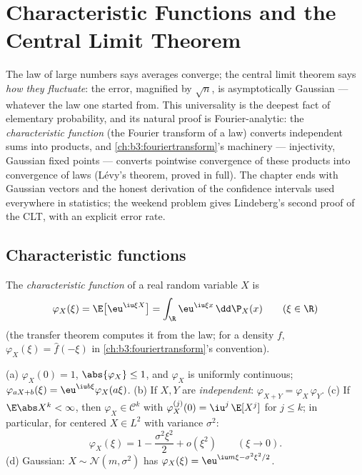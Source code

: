 \chapter{Characteristic Functions and the Central Limit
Theorem}\label{ch:b3:clt}

The law of large numbers says averages converge; the central
limit theorem says \emph{how they fluctuate}: the error,
magnified by $\sqrt n$, is asymptotically Gaussian ---
whatever the law one started from. This universality is the
deepest fact of elementary probability, and its natural proof
is Fourier-analytic: the \emph{characteristic function}
(the Fourier transform of a law) converts independent sums
into products, and \cref{ch:b3:fouriertransform}'s machinery
--- injectivity, Gaussian fixed points --- converts pointwise
convergence of these products into convergence of laws
(L\'evy's theorem, proved in full). The chapter ends with
Gaussian vectors and the honest derivation of the confidence
intervals used everywhere in statistics; the weekend problem
gives Lindeberg's second proof of the CLT, with an explicit
error rate.

\section{Characteristic functions}

\begin{definition}\label{def:b3:clt:cf}
The \emph{characteristic function} of a real random variable $X$ is
\[
\varphi_X(\xi) = \E\bigl[\eu^{\iu\xi X}\bigr]
= \int_\R \eu^{\iu\xi x}\,\dd\P_X(x)
\qquad (\xi \in \R)
\]
(the transfer theorem computes it from the law; for a density
$f$, $\varphi_X(\xi) = \hat f(-\xi)$ in
\cref{ch:b3:fouriertransform}'s convention).
\end{definition}

\begin{proposition}\label{prop:b3:clt:cfbasics}
(a) $\varphi_X(0) = 1$, $\abs{\varphi_X} \leq 1$, and
$\varphi_X$ is uniformly continuous;
$\varphi_{aX + b}(\xi) = \eu^{\iu b\xi}\varphi_X(a\xi)$.
(b) If $X, Y$ are \emph{independent}:
$\varphi_{X+Y} = \varphi_X\,\varphi_Y$.
(c) If $\E\abs X^k < \infty$, then $\varphi_X \in \mathcal
C^k$ with $\varphi_X^{(j)}(0) = \iu^j\,\E[X^j]$ for $j \leq
k$; in particular, for centered $X \in L^2$ with variance
$\sigma^2$:
\[
\varphi_X(\xi) = 1 - \frac{\sigma^2\xi^2}{2} +
o(\xi^2) \qquad (\xi \to 0).
\]
(d) Gaussian: $X \sim \mathcal N(m, \sigma^2)$ has
$\varphi_X(\xi) = \eu^{\iu m\xi - \sigma^2\xi^2/2}$.
\end{proposition}


